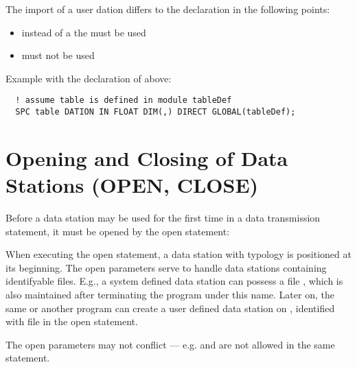 The import of a user dation differs to the declaration in the following points:
\begin{itemize}
\item instead of a  the  must be used
\item {} must not be used
\end{itemize}

Example with the declaration of  above:
\begin{lstlisting}
  ! assume table is defined in module tableDef
  SPC table DATION IN FLOAT DIM(,) DIRECT GLOBAL(tableDef);
\end{lstlisting}

\section{Opening and Closing of Data Stations (OPEN, CLOSE)}   %
\label{sec_dation_open_close}

Before a data station may be used for the first time in a data
transmission statement, it must be opened by the open statement:

\begin{grammarframe}

\end{grammarframe}

When executing the open statement, a data station with typology is
positioned at its beginning.
The open parameters serve to handle data stations containing
identifyable files. E.g., a system defined data station  can possess
a file , which is also maintained after terminating the program
under this name. Later on, the same or another program can create a user
defined data station  on , identified with file  in the
open statement.


\begin{grammarframe}

\end{grammarframe}


The open parameters may not conflict --- e.g.  and  are not allowed
in the same statement.



